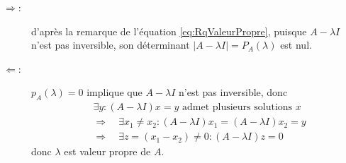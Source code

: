 \proof 
  \begin{description}
    \item[$\Rightarrow$:] d'après la remarque de l'équation \eqref{eq:RqValeurPropre}, puisque $A - \lambda I$ n'est pas inversible, son déterminant $|A - \lambda I| = P_A(\lambda)$ est nul.
    \item[$\Leftarrow$:] $p_A(\lambda) = 0$ implique que $A - \lambda I$ n'est pas inversible, donc
      \begin{align*}
        & \exists y: (A - \lambda I)x = y \text{ admet plusieurs solutions $x$} \\
        & \Rightarrow \quad \exists x_1 \neq x_2: (A - \lambda I)x_1 = (A - \lambda I)x_2 = y \\
        & \Rightarrow \quad \exists z = (x_1 - x_2) \neq 0: (A - \lambda I)z = 0 
      \end{align*} 
      donc $\lambda$ est valeur propre de $A$. 
  \end{description}
\eproof

